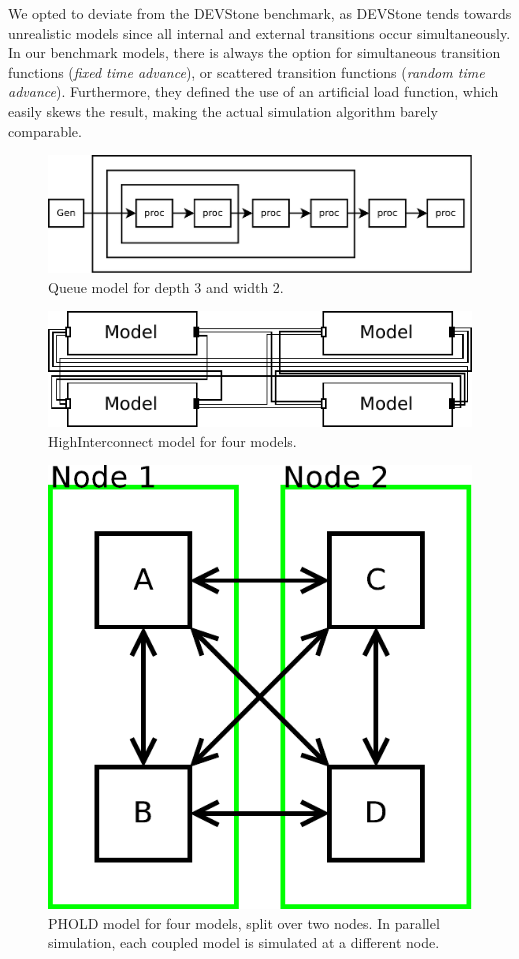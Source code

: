 We opted to deviate from the DEVStone benchmark, as DEVStone tends towards unrealistic models since all internal and external transitions occur simultaneously.
In our benchmark models, there is always the option for simultaneous transition functions (\textit{fixed time advance}), or scattered transition functions (\textit{random time advance}).
Furthermore, they defined the use of an artificial load function, which easily skews the result, making the actual simulation algorithm barely comparable.

\begin{figure}
    \center
    \includegraphics[width=\columnwidth]{fig/queue_model.pdf}
    \caption{Queue model for depth 3 and width 2.}
    \label{fig:queue_model}
\end{figure}

\begin{figure}
    \center
    \includegraphics[width=\columnwidth]{fig/interconnect_model.pdf}
    \caption{HighInterconnect model for four models.}
    \label{fig:interconnect_model}
\end{figure}

\begin{figure}
    \center
    \includegraphics[width=0.5\columnwidth]{fig/phold_model.pdf}
    \caption{PHOLD model for four models, split over two nodes. In parallel simulation, each coupled model is simulated at a different node.}
    \label{fig:PHOLD_model}
\end{figure}

